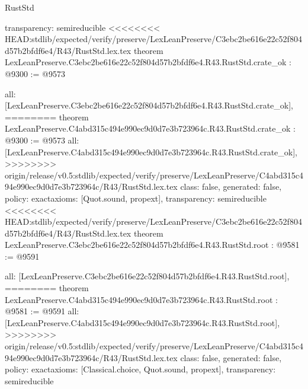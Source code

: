 \begin{lexlean}{RustStd}
\begin{coremodule}
{\begin{coremodule}
{{{{{{{{{{{{{{  transparency: semireducible
}
<<<<<<<< HEAD:stdlib/expected/verify/preserve/LexLeanPreserve/C3ebc2be616e22c52f804d57b2bfdf6e4/R43/RustStd.lex.tex
theorem LexLeanPreserve.C3ebc2be616e22c52f804d57b2bfdf6e4.R43.RustStd.crate_ok : @9300 := @9573 {
  all: [LexLeanPreserve.C3ebc2be616e22c52f804d57b2bfdf6e4.R43.RustStd.crate_ok],
========
theorem LexLeanPreserve.C4abd315c494e990ec9d0d7e3b723964c.R43.RustStd.crate_ok : @9300 := @9573 {
  all: [LexLeanPreserve.C4abd315c494e990ec9d0d7e3b723964c.R43.RustStd.crate_ok],
>>>>>>>> origin/release/v0.5:stdlib/expected/verify/preserve/LexLeanPreserve/C4abd315c494e990ec9d0d7e3b723964c/R43/RustStd.lex.tex
  class: false,
  generated: false,
  policy: exact{axioms: [Quot.sound, propext]},
  transparency: semireducible
}
<<<<<<<< HEAD:stdlib/expected/verify/preserve/LexLeanPreserve/C3ebc2be616e22c52f804d57b2bfdf6e4/R43/RustStd.lex.tex
theorem LexLeanPreserve.C3ebc2be616e22c52f804d57b2bfdf6e4.R43.RustStd.root : @9581 := @9591 {
  all: [LexLeanPreserve.C3ebc2be616e22c52f804d57b2bfdf6e4.R43.RustStd.root],
========
theorem LexLeanPreserve.C4abd315c494e990ec9d0d7e3b723964c.R43.RustStd.root : @9581 := @9591 {
  all: [LexLeanPreserve.C4abd315c494e990ec9d0d7e3b723964c.R43.RustStd.root],
>>>>>>>> origin/release/v0.5:stdlib/expected/verify/preserve/LexLeanPreserve/C4abd315c494e990ec9d0d7e3b723964c/R43/RustStd.lex.tex
  class: false,
  generated: false,
  policy: exact{axioms: [Classical.choice, Quot.sound, propext]},
  transparency: semireducible
}

}}}}}}}}}}}}}}}
\end{coremodule}}
\end{coremodule}
\end{lexlean}
